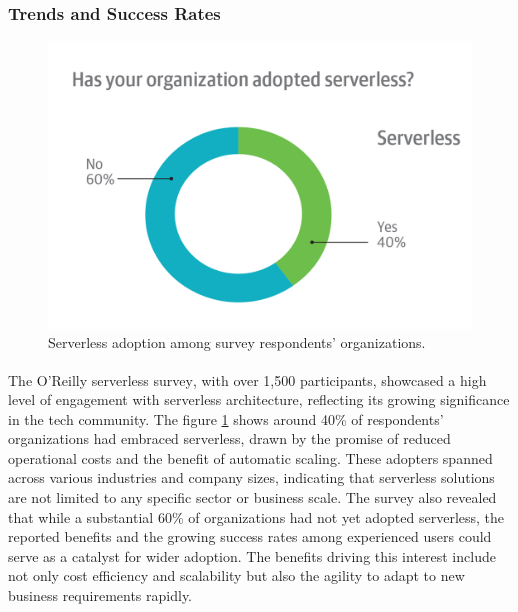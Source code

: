 \newpage

\subsubsection{Trends and Success Rates}

\begin{figure}
    \centering
    \includegraphics[scale=0.15]{Pictures/3_serverless_adoption.png}
    \caption{Serverless adoption among survey respondents’ organizations.}
    \label{fig:3_serverless_adoption}
\end{figure}

The O'Reilly serverless survey\textsuperscript{\cite{serverless_7}}, with over 1,500 participants,
showcased a high level of engagement with serverless architecture, reflecting its growing
significance in the tech community. The figure \ref{fig:3_serverless_adoption} shows around 40\% of
respondents' organizations had embraced serverless, drawn by the promise of reduced operational
costs and the benefit of automatic scaling. These adopters spanned across various industries and
company sizes, indicating that serverless solutions are not limited to any specific sector or
business scale. The survey also revealed that while a substantial 60\% of organizations had not yet
adopted serverless, the reported benefits and the growing success rates among experienced users
could serve as a catalyst for wider adoption. The benefits driving this interest include not only
cost efficiency and scalability but also the agility to adapt to new business requirements rapidly.

